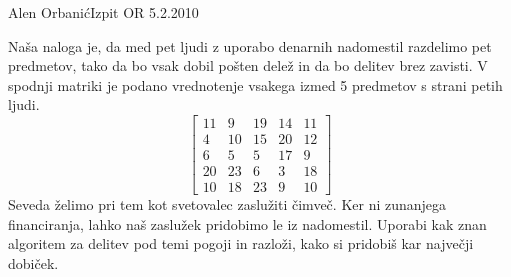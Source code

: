 \begin{naloga}{Alen Orbanić}{Izpit OR 5.2.2010}
\begin{vprasanje}
Naša naloga je,
da med pet ljudi z uporabo denarnih nadomestil razdelimo pet predmetov,
tako da bo vsak dobil pošten delež in da bo delitev brez zavisti.
V spodnji matriki je podano vrednotenje vsakega izmed 5 predmetov
s strani petih ljudi.
$$
\begin{bmatrix}
11 &  9 & 19 & 14 & 11 \\
 4 & 10 & 15 & 20 & 12 \\
 6 &  5 &  5 & 17 & 9  \\
20 & 23 &  6 &  3 & 18 \\
10 & 18 & 23 &  9 & 10
\end{bmatrix}
$$
Seveda želimo pri tem kot svetovalec zaslužiti čimveč.
Ker ni zunanjega financiranja, lahko naš zaslužek pridobimo le iz nadomestil.
Uporabi kak znan algoritem za delitev pod temi pogoji in razloži,
kako si pridobiš kar največji dobiček.
\end{vprasanje}


\end{naloga}
